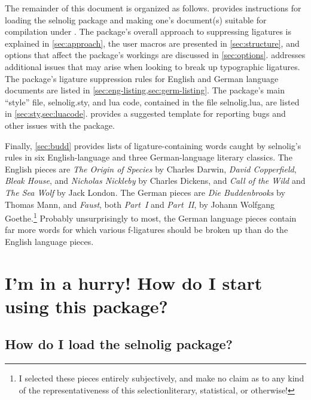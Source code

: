 \documentclass[11pt]{article}
\newcommand{\pkg}[1]{\textsf{#1}}
\begin{document}
The remainder of this document is organized as follows.  provides instructions for loading the \pkg{selnolig} package and making one's document(s) suitable for compilation under \LuaLaTeX. The package's overall approach to suppressing ligatures is explained in \cref{sec:approach}, the user macros are presented in \cref{sec:structure}, and options that affect the package's workings are discussed in \cref{sec:options}.  addresses additional issues that may arise when looking to break up typographic ligatures. The package's ligature suppression rules for English and German language documents are listed in \cref{sec:eng-listing,sec:germ-listing}. The package's main \enquote{style} file, \pkg{selnolig.sty}, and lua code, contained in the file \pkg{selnolig.lua}, are listed in \cref{sec:sty,sec:luacode}.  provides a suggested template for reporting bugs and other issues with the package. 

Finally, \cref{sec:budd} provides lists of ligature-containing words caught by \pkg{selnolig}'s rules in six English-language and three German-language literary classics. The English pieces are \emph{The Origin of Species} by Charles Darwin, \emph{David Copperfield}, \emph{Bleak House}, and \emph{Nicholas Nickleby} by Charles Dickens, and \emph{Call of the Wild} and \emph{The Sea Wolf} by Jack London. The German pieces are \emph{Die Buddenbrooks} by Thomas Mann, and \emph{Faust}, both \emph{Part~I} and \emph{Part~II}, by Johann Wolfgang Goethe.\footnote{I selected these pieces entirely subjectively, and make no claim as to any kind of the representativeness of this selection\textemdash literary, statistical, or otherwise!} Probably unsurprisingly to most, the German language pieces contain far more words for which various f-ligatures should be broken up than do the English language pieces. 



\section{I'm in a hurry! How do I start using this package?} \label{sec:hurry}

\subsection[How do I load the selnolig package?]{How do I load the \pkg{selnolig} package?}
\end{document}
